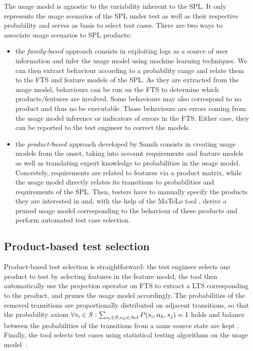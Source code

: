 The usage model is agnostic to the variability inherent to the SPL. It only represents the usage scenarios of the SPL under test as well as their respective probability and serves as basis to select test cases. There are two ways to associate usage scenarios to SPL products:  
%
\begin{itemize}
\item the \emph{family-based} approach \cite{Devroey2014,Devroey2015a} consists in exploiting logs as a source of user information and infer the usage model using machine learning techniques. We can then extract behaviour according to a probability range and relate them to the FTS and feature models of the SPL. As they are extracted from the usage model, behaviours can be run on the FTS to determine which products/features are involved. Some behaviours may also correspond to no product and thus no be executable. Those behaviours are errors coming from the usage model inference or indicators of errors in the FTS. Either case, they can be reported to the test engineer to correct the models.
%
\item the \emph{product-based} approach developed by Samih \etal \cite{Samih2014,Samih2014b} consists in creating usage models from the onset, taking into account requirements and feature models as well as translating expert knowledge to probabilities in the usage model. Concretely, requirements are related to features via a product matrix, while the usage model directly relates its transitions to probabilities and requirements of the SPL. Then, testers have to manually specify the products they are interested in and, with the help of the MaTeLo tool \cite{Samih2014c,matelo}, derive a pruned usage model corresponding  to the behaviour of these products and perform automated test case selection. 
\end{itemize}

\subsection{Product-based test selection}

Product-based test selection is straightforward: the test engineer selects one product to test by selecting features in the feature model, the tool then automatically use the projection operator on FTS to extract a LTS corresponding to the product, and prunes the usage model accordingly. The probabilities of the removed transitions are proportionally distributed on adjacent transitions, so that the probability axiom $\forall s_i \in S : \sum_{s_j \in S, \alpha_k \in \mathit{Act}} P( s_i , \alpha_k, s_j ) = 1$ holds and balance between the probabilities of the transitions from a same source state are kept \cite{Samih2014b}. Finally, the tool selects test cases using statistical testing algorithms on the usage model~\cite{Whittaker1994,Feliachi2010}.

